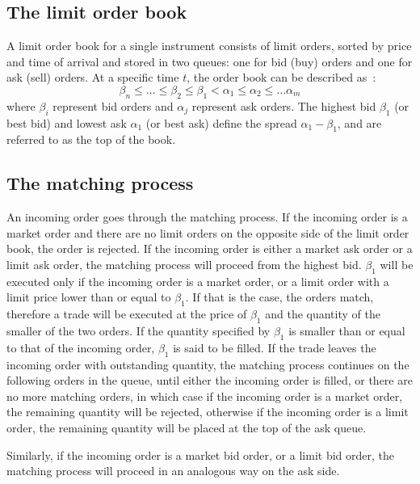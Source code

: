\subsection{The limit order book}
A limit order book for a single instrument consists of limit orders, sorted by price and time of arrival and stored in two queues: one for bid (buy) orders and one for ask (sell) orders. At a specific time $t$, the order book can be described as~\cite{Gilles2006}: 
\begin{equation*}
\beta_n \leq \ldots \leq \beta_2 \leq \beta_1 < \alpha_1 \leq \alpha_2 \leq \ldots \alpha_m
\end{equation*}
where $\beta_i$ represent bid orders and $\alpha_j$ represent ask orders. The highest bid $\beta_1$ (or best bid) and lowest ask $\alpha_1$ (or best ask) define the spread $\alpha_1 - \beta_1$, and are referred to as the top of the book.

\subsection{The matching process}
\label{Chapters/Background/Matching-Process}

An incoming order goes through the matching process. If the incoming order is a market order and there are no limit orders on the opposite side of the limit order book, the order is rejected. If the incoming order is either a market ask order or a limit ask order, the matching process will proceed from the highest bid. $\beta_1$ will be executed only if the incoming order is a market order, or a limit order with a limit price lower than or equal to $\beta_1$. If that is the case, the orders match, therefore a trade will be executed at the price of $\beta_1$ and the quantity of the smaller of the two orders. If the quantity specified by $\beta_1$ is smaller than or equal to that of the incoming order, $\beta_1$ is said to be filled. If the trade leaves the incoming order with outstanding quantity, the matching process continues on the following orders in the queue, until either the incoming order is filled, or there are no more matching orders, in which case if the incoming order is a market order, the remaining quantity will be rejected, otherwise if the incoming order is a limit order, the remaining quantity will be placed at the top of the ask queue.

Similarly, if the incoming order is a market bid order, or a limit bid order, the matching process will proceed in an analogous way on the ask side.

